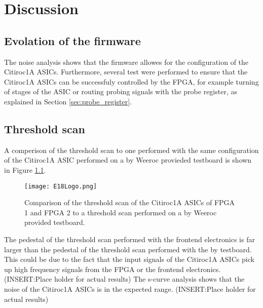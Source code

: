 \chapter{Discussion}\label{cha: discussion}
\section{Evolation of the firmware}
The noise analysis shows that the firmware allowes for the configuration of the Citiroc1A ASICs.
\newline
Furthermore, several test were performed to ensure that the Citiroc1A ASICs can be successfuly controlled by the FPGA,
for example turning of stages of the ASIC or routing probing signals with the probe register,
as explained in Section \ref{sec:probe_register}.

\section{Threshold scan}
A comperison of the threshold scan to one performed with the same configuration of the Citiroc1A ASIC performed on a by Weeroc provieded testboard is shown in Figure \ref{fig:threshold_scan_comparison}. 
\begin{figure}[H]
    \centering
    \texttt{[image: E18Logo.png]}
    \caption{Comparison of the threshold scan of the Citiroc1A ASICs of FPGA 1 and FPGA 2 to a threshold scan performed on a by Weeroc provided testboard.}
    \label{fig:threshold_scan_comparison}
\end{figure}
The pedestal of the threshold scan performed with the frontend electronics is far larger than the pedestal of the threshold scan performed with the by testboard.
This could be due to the fact that the input signals of the Citiroc1A ASICs pick up high frequency signals from the FPGA or the frontend electronics. 
\newline
(INSERT:Place holder for actual results)
\newline
The s-curve analysis shows that the noise of the Citiroc1A ASICs is in the expected range.
\newline
(INSERT:Place holder for actual results)